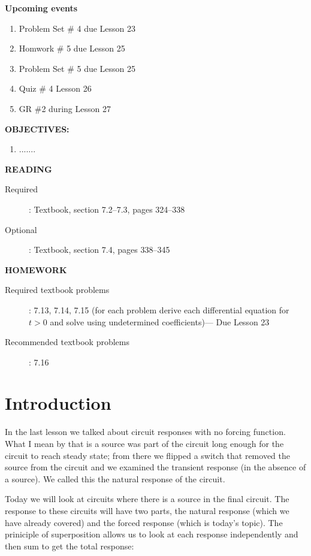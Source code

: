 \documentclass{handout}
\begin{document}
\maketitle

\textbf{Upcoming events}
\begin{enumerate}
\item Problem Set \# 4 due Lesson 23
\item Homwork \# 5 due Lesson 25
\item Problem Set \# 5 due Lesson 25
\item Quiz \# 4 Lesson 26
\item GR \#2 during Lesson 27
\end{enumerate}

\textbf{OBJECTIVES:}
\begin{enumerate}
\item .......
\end{enumerate}

\textbf{READING}
\begin{description}
\item [Required]:
Textbook, section 7.2--7.3, pages 324--338

\item [Optional]: Textbook, section 7.4, pages 338--345
\end{description}

\textbf{HOMEWORK}
\begin{description}
\item [Required textbook problems]: 7.13, 7.14, 7.15 (for each problem derive each differential equation for $t>0$ and solve using undetermined coefficients)--- Due Lesson 23
\item [Recommended textbook problems]: 7.16
\end{description}

\section{Introduction}
In the last lesson we talked about circuit responses with no forcing function.  What I mean by that is a source was part of the circuit long enough for the circuit to reach steady state; from there we flipped a switch that removed the source from the circuit and we examined the transient response (in the absence of a source).  We called this the natural response of the circuit.  

Today we will look at circuits where there is a source in the final circuit.  The response to these circuits will have two parts, the natural response (which we have already covered) and the forced response (which is today's topic).  The priniciple of superposition allows us to look at each response independently and then sum to get the total response:
\soln{0.5in}{
\[
v(t) = v_N(t)+v_F(t)
\]
}
\end{document}
